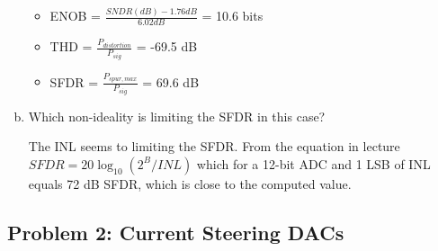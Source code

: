 \documentclass[11pt]{article}
\begin{document}
\begin{enumerate}[a)]
\begin{itemize}
        \item ENOB = $\frac{SNDR(dB) - 1.76 dB}{6.02 dB}$ = 10.6 bits

        \item THD = $\frac{P_{distortion}}{P_{sig}}$ = -69.5 dB

        \item SFDR = $\frac{P_{spur,max}}{P_{sig}}$ = 69.6 dB
      \end{itemize}

    \item Which non-ideality is limiting the SFDR in this case?

      The INL seems to limiting the SFDR. From the equation in lecture $SFDR = 20 \log_{10}(2^B / INL)$ which for a 12-bit ADC and 1 LSB of INL equals 72 dB SFDR, which is close to the computed value.
\end{enumerate}

\subsection*{Problem 2: Current Steering DACs}
\end{document}
